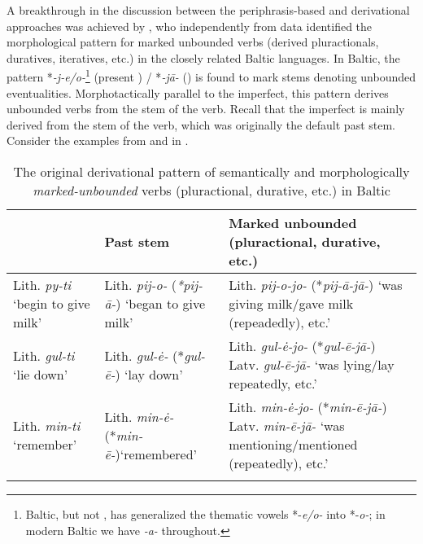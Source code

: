 \documentclass[output=paper]{langsci/langscibook}
\begin{document}
A breakthrough in the discussion between the periphrasis-based and derivational approaches was achieved by \citet{Ostrowski2006}, who independently from  data identified the morphological pattern for marked unbounded verbs (derived pluractionals, duratives, iteratives, etc.) in the closely related Baltic languages. In Baltic, the pattern *\textit{-j-e/o-}\footnote{Baltic, but not , has generalized the thematic vowels *-\textit{e/o-} into *-\textit{o-}; in modern Baltic we have \textit{-a-} throughout.} (present ) / *\textit{-jā-} () is found to mark stems denoting unbounded eventualities. Morphotactically parallel to the  imperfect, this pattern derives unbounded verbs from the  stem of the verb. Recall that the  imperfect is mainly derived from the  stem of the verb, which was originally the default past stem. Consider the examples from  and  in .


\begin{table}[h]
\caption{The original derivational pattern of semantically and morphologically \textit{marked-unbounded} verbs (pluractional, durative, etc.) in Baltic}
\label{tab:wiemerserzant:6}
\begin{tabularx}{\textwidth}{>{\raggedright}p{2cm}p{3.5cm}Q}
\lsptoprule
{} & Past  stem & Marked unbounded
 (pluractional, durative, etc.)\\
\midrule
Lith. \textit{py-ti} 
‘begin to give milk’ & Lith. \textit{pij-o-} (\textit{*pij-ā-}) \newline
‘began to give milk’ & Lith. \textit{pij-o-jo-} (*\textit{pij-ā-jā-}) \newline
‘was giving milk/gave milk (repeadedly), etc.’\\
\tablevspace
Lith. \textit{gul-ti} 
‘lie down’ & Lith. \textit{gul-\.e-} (*\textit{gul-ē-}) \newline
‘lay down’ & Lith. \textit{gul-\.e-jo-} (*\textit{gul-ē-jā-}) \newline
Latv. \textit{gul-ē-jā-} \newline
‘was lying/lay repeatedly, etc.’\\
\tablevspace
Lith. \textit{min-ti} 
‘remember’ & Lith. \textit{min-\.e-} (*\textit{min-ē-})\newline ‘remembered’ & Lith. \textit{min-\.e-jo-} (*\textit{min-ē-jā-}) \newline
Latv. \textit{min-ē-jā-} \newline
‘was mentioning/mentioned 
(repeatedly), etc.’\\
\lspbottomrule
\end{tabularx}
\end{table}
\end{document}
